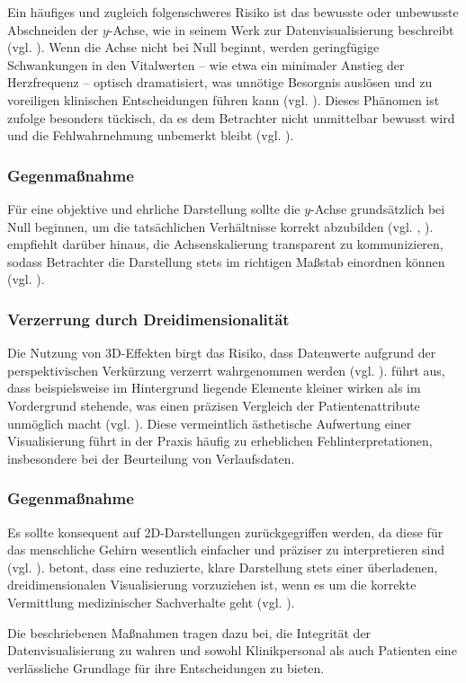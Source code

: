 Ein häufiges und zugleich folgenschweres Risiko ist das bewusste oder unbewusste Abschneiden der \(y\)-Achse, wie \citeauthor{1} in seinem Werk zur Datenvisualisierung beschreibt (vgl. \cite[50]{1}). Wenn die Achse nicht bei Null beginnt, werden geringfügige Schwankungen in den Vitalwerten – wie etwa ein minimaler Anstieg der Herzfrequenz – optisch dramatisiert, was unnötige Besorgnis auslösen und zu voreiligen klinischen Entscheidungen führen kann (vgl. \cite[31, 43]{2}). Dieses Phänomen ist \citeauthor{2} zufolge besonders tückisch, da es dem Betrachter nicht unmittelbar bewusst wird und die Fehlwahrnehmung unbemerkt bleibt (vgl. \cite[31]{2}).

\subsubsection{Gegenmaßnahme}
Für eine objektive und ehrliche Darstellung sollte die \(y\)-Achse grundsätzlich bei Null beginnen, um die tatsächlichen Verhältnisse korrekt abzubilden (vgl. \cite[50]{1}, \cite[44]{2}). \citeauthor{2} empfiehlt darüber hinaus, die Achsenskalierung transparent zu kommunizieren, sodass Betrachter die Darstellung stets im richtigen Maßstab einordnen können (vgl. \cite[44]{2}).

\subsubsection{Verzerrung durch Dreidimensionalität}

Die Nutzung von 3D-Effekten birgt das Risiko, dass Datenwerte aufgrund der perspektivischen Verkürzung verzerrt wahrgenommen werden (vgl. \cite[54, 58]{2}). \citeauthor{2} führt aus, dass beispielsweise im Hintergrund liegende Elemente kleiner wirken als im Vordergrund stehende, was einen präzisen Vergleich der Patientenattribute unmöglich macht (vgl. \cite[54]{2}). Diese vermeintlich ästhetische Aufwertung einer Visualisierung führt in der Praxis häufig zu erheblichen Fehlinterpretationen, insbesondere bei der Beurteilung von Verlaufsdaten.

\subsubsection{Gegenmaßnahme}
Es sollte konsequent auf 2D-Darstellungen zurückgegriffen werden, da diese für das menschliche Gehirn wesentlich einfacher und präziser zu interpretieren sind (vgl. \cite[54]{2}). \citeauthor{2} betont, dass eine reduzierte, klare Darstellung stets einer überladenen, dreidimensionalen Visualisierung vorzuziehen ist, wenn es um die korrekte Vermittlung medizinischer Sachverhalte geht (vgl. \cite[54]{2}).

Die beschriebenen Maßnahmen tragen dazu bei, die Integrität der Datenvisualisierung zu wahren und sowohl Klinikpersonal als auch Patienten eine verlässliche Grundlage für ihre Entscheidungen zu bieten.

